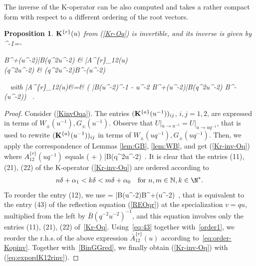 \documentclass[11pt]{amsart}
\numberwithin{equation}{section}
\newtheorem{prop}[thm]{Proposition}
\numberwithin{equation}{section}
\begin{document}
The inverse of the K-operator can be also computed and takes a rather compact form with respect to a different ordering of the root vectors. 
\begin{prop}\label{prop:Kr-inv}
${\bold K}^{\{r\}}(u)$ from (\ref{Kr-Oq}) is invertible, and its inverse is given by
	\beqa
		^{-1}=- 
		\begin{pmatrix} 
			B^+(u^{-2}){\bar B}(q^2u^{-2})  &  \qquad 	\bar{A}^{\{r\}}_{12}(u)  \\ 
			(q^2u^{-2}) & 	(q^2u^{-2})B^-(u^{-2})
		\end{pmatrix}  \label{Kr-inv-Oq} \ 
		\eeqa
		with 
		\beqa
		\qquad \bar{A}^{\{r\}}_{12}(u)&=& \left(   {\bar B}(u^{-2})^{-1}  - u^{-2} B^{+}(u^{-2}){\bar B}(q^2u^{-2})  B^{-}(u^{-2})\right)
		\ . \label{eq:expordK12rinv}
		\eeqa
\end{prop}
\begin{proof} Consider (\ref{KinvOqa}). The entries $({\bold K}^{\{a\}}(u^{-1}))_{ij}$, $i,j=1,2$, are expressed in terms of $W_\pm(u^{-1}),G_\pm(u^{-1})$. Observe that  $U|_{u\rightarrow u^{-1}}= U|_{u\rightarrow uq^{-1}}$, that is used  to rewrite $({\bold K}^{\{a\}}(u^{-1}))_{ij}$ in terms of $W_\pm(uq^{-1}),G_\pm(uq^{-1})$. Then, 
we apply the correspondence of Lemmas \ref{lem:GB}, \ref{lem:WB}, and get (\ref{Kr-inv-Oq}) where ${A}^{\{r\}}_{12}(uq^{-1})$ equals
	\beqa
	  \left(  +  \right) {\bar B}(q^2u^{-2})\ . \nonumber
	\eeqa  
	It is clear that the entries (11), (21), (22) of the K-operator (\ref{Kr-inv-Oq}) are ordered according to
\begin{align}\label{eq:order-Kopinv}
 n\delta+\alpha_1 < k\delta < m\delta+\alpha_0\quad \mbox{for $n,m\in {\mathbb N}, k\in\N^*$}.
\end{align} 
	To  reorder the entry (12), we use
	\beqa
	 = {\bar B}(u^{-2})B^{+}(u^{-2})\ ,\label{eq:43}
	\eeqa
	that is equivalent to the entry (43) of the reflection equation (\ref{REOqr}) at the specialization $v=qu$, multiplied from the left by ${\bar B}(q^{-2}u^{-2})^{-1}$, and this equation involves only the entries (11), (21), (22) of~\eqref{Kr-Oq}. 
	Using~\eqref{eq:43}  together with~\eqref{order1}, we reorder the r.h.s.\,of the above expression $\bar{A}^{\{r\}}_{12}(u)$ according to~\eqref{eq:order-Kopinv}. Together with~\eqref{BinGGred}, we finally obtain (\ref{Kr-inv-Oq}) with (\ref{eq:expordK12rinv}).	
\end{proof}	
\end{document}
